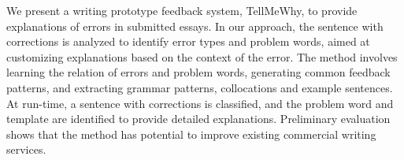 We present a writing prototype feedback system, TellMeWhy, to provide explanations of errors in submitted essays.
In our approach, the sentence with corrections is analyzed to identify error types and problem words, aimed at customizing explanations based on the context of the error.
The method involves learning the relation of errors and problem words, generating common feedback patterns, and extracting grammar patterns, collocations and example sentences. 
At run-time, a sentence with corrections is classified, and the problem word and template are identified to provide detailed explanations.
Preliminary evaluation shows that the method has potential to improve existing commercial writing services.